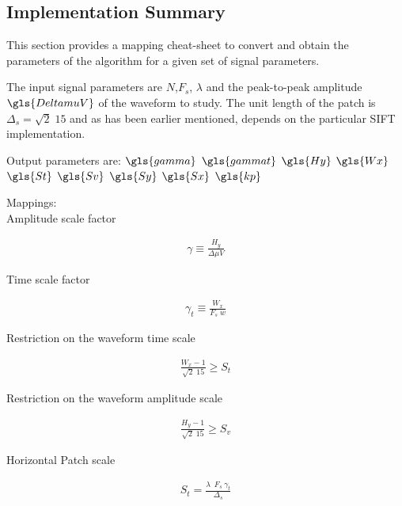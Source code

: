 \begin{subappendices}

\section{Implementation Summary}

This section provides a mapping cheat-sheet to convert and obtain the parameters of the algorithm for a given set of signal parameters.

The input signal parameters are $N$,$F_s$, $\lambda$ and the peak-to-peak amplitude $\gls{DeltamuV}$ of the waveform to study. The unit length of the patch is $\Delta_s = \sqrt{2} \; 15$ and as has been earlier mentioned, depends on the particular SIFT implementation.

Output parameters are: 
$\gls{gamma}$
$\gls{gammat}$
$\gls{Hy}$
$\gls{Wx}$
$\gls{St}$
$\gls{Sv}$
$\gls{Sy}$
$\gls{Sx}$
$\gls{kp}$

Mappings:\\

Amplitude scale factor

\begin{align*}
\gamma \equiv \frac{H_y}{\Delta \mu V}  
\end{align*}

Time scale factor

\begin{align*}
\gamma_t \equiv \frac{W_x}{F_s \; w}  
\end{align*}

%

Restriction on the waveform time scale

\begin{align*}
\frac{W_x-1}{\sqrt{2} \; 15}  \geq S_t 
\end{align*}

Restriction on the waveform amplitude scale

\begin{align*}
\frac{H_y-1}{\sqrt{2} \; 15}  \geq S_v 
\end{align*}

Horizontal Patch scale

\begin{align*}
S_t = \frac{ \lambda \;  \  F_s \ \gamma_t }{\Delta_s}
\end{align*}


\end{subappendices}
